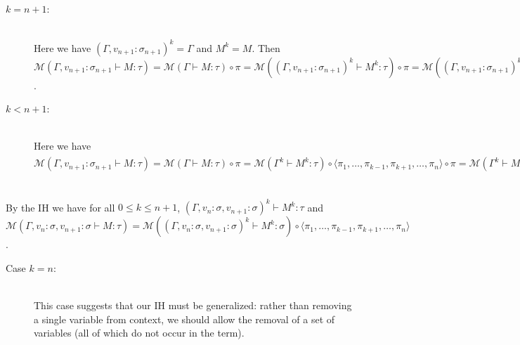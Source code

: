 \documentclass{article}
\newcommand{\mbf}{\mathbf}
\begin{document}
\begin{description}
\begin{description}

\item[$k = n+1$:]~\\
Here we have $(\Gamma,v_{n+1}:\sigma_{n+1})^k = \Gamma$ and $M^k = M$.
Then $\mathcal M(\Gamma,v_{n+1} : \sigma_{n+1} \vdash M : \tau) = \mathcal M(\Gamma \vdash M : \tau) \circ \pi
= \mathcal M((\Gamma,v_{n+1}:\sigma_{n+1})^k \vdash M^k : \tau) \circ \pi 
= \mathcal M((\Gamma,v_{n+1}:\sigma_{n+1})^k \vdash M^k : \tau) \circ \langle \pi_1, \ldots, \pi_{k-1} (= \pi_{n}) \rangle$.

\item[$k < n+1$:]~\\
Here we have $\mathcal M(\Gamma,v_{n+1} : \sigma_{n+1} \vdash M : \tau) = \mathcal{M}(\Gamma \vdash M : \tau) \circ \pi
= \mathcal{M}(\Gamma^{k} \vdash M^{k} : \tau) \circ \langle \pi_1, \ldots, \pi_{k-1},\pi_{k+1},\ldots,\pi_n \rangle \circ \pi
= \mathcal{M}(\Gamma^{k} \vdash M^{k} : \tau) \circ \pi \circ \langle \pi_1, \ldots, \pi_{k-1},\pi_{k+1},\ldots,\pi_n,\pi_{n+1} \rangle = \mathcal M( (\Gamma, v_{n+1})^k \vdash M^k : \tau) \circ \langle \pi_1, \ldots, \pi_{k-1},\pi_{k+1},\ldots,\pi_n,\pi_{n+1} \rangle$ 

\end{description}

\item[Case $\mbf{contraction}$:]~\\

By the IH we have for all $0 \leq k \leq n + 1$, $(\Gamma,v_{n} : \sigma, v_{n+1} : \sigma)^k \vdash M^k : \tau$
and 
$\mathcal M(\Gamma,v_n:\sigma,v_{n+1}:\sigma \vdash M : \tau) 
= \mathcal M((\Gamma,v_n:\sigma,v_{n+1}:\sigma)^k \vdash M^k : \sigma) \circ \langle \pi_1, \ldots, \pi_{k-1},\pi_{k+1},\ldots,\pi_n \rangle$.



\begin{description}

\item[Case $k = n$:]~\\
 

This case suggests that our IH must be generalized: rather than removing a single variable from context, we should
allow the removal of a set of variables (all of which do not occur in the term).\\~\\


\end{description}
\end{description}
\end{document}
